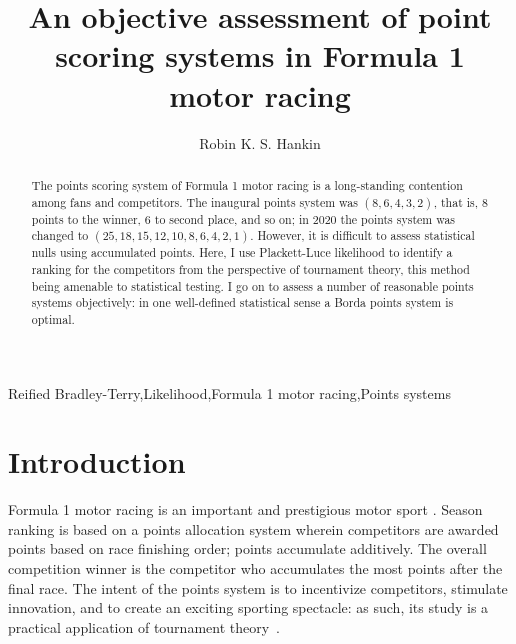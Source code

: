 \documentclass{elsarticle}
\begin{document}
\begin{frontmatter}
  \title{An objective assessment of point scoring systems in Formula 1 motor racing}
  \author{Robin K. S. Hankin}
  \address{AUT University, 55 Wellesley Street, Auckland 1010, New Zealand\\
  }


\begin{abstract}
The points scoring system of Formula 1 motor racing is a long-standing
contention among fans and competitors.  The inaugural points system
was $(8,6,4,3,2)$, that is, 8 points to the winner, 6 to second place,
and so on; in 2020 the points system was changed to
$(25,18,15,12,10,8,6,4,2,1)$.  However, it is difficult to assess
statistical nulls using accumulated points.  Here, I use Plackett-Luce
likelihood to identify a ranking for the competitors from the
perspective of tournament theory, this method being amenable to
statistical testing.  I go on to assess a number of reasonable points
systems objectively: in one well-defined statistical sense a Borda
points system is optimal.
\end{abstract}
\begin{keyword}
Reified Bradley-Terry\sep Likelihood\sep Formula 1 motor racing\sep Points systems
\end{keyword}


\end{frontmatter}
\linenumbers

\newcommand{\raik}{R\"{a}ikk\"{o}nen}

\section{Introduction}\label{introduction}
Formula 1 motor racing is an important and prestigious motor sport
\citep{codling2017,jenkins2010}.  Season ranking is based on a points
allocation system wherein competitors are awarded points based on race
finishing order; points accumulate additively.  The overall
competition winner is the competitor who accumulates the most points
after the final race.  The intent of the points system is to
incentivize competitors, stimulate innovation, and to create an
exciting sporting spectacle: as such, its study is a practical
application of tournament theory~\citep{lazear1981}.
\end{document}
